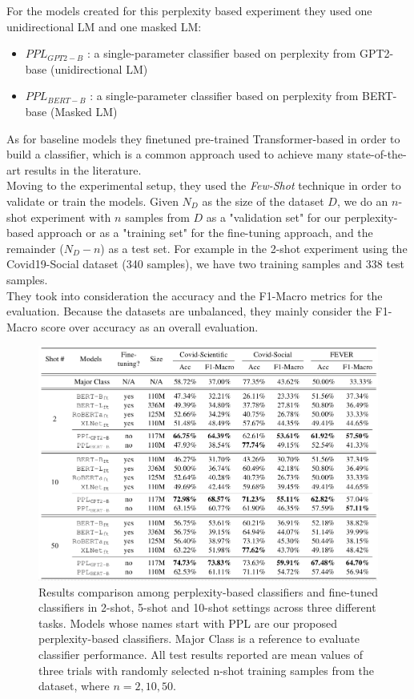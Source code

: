 \documentclass[10pt, english]{report}
\begin{document}
For the models created for this perplexity based experiment they used one unidirectional LM and one masked LM:

\begin{itemize}
\item $PPL_{GPT2-B}$ : a single-parameter classifier based on perplexity from GPT2-base \cite{radford2019language} (unidirectional LM)
\item $PPL_{BERT-B}$ : a single-parameter classifier based on perplexity from BERT-base \cite{devlin2018bert} (Masked LM)
\end{itemize}

As for baseline models they finetuned pre-trained Transformer-based \cite{vaswani2017attention} in order to build a classifier, which is a common approach used to achieve many state-of-the-art results in the literature.\\

Moving to the experimental setup, they used the \textit{Few-Shot} technique in order to validate or train the models. Given $N_D$ as the size of the dataset $D$, we do an $n$-shot experiment with $n$ samples from $D$ as a "validation set" for our perplexity-based approach or as a "training set" for the fine-tuning approach, and the remainder ($N_D - n$) as a test set. For example in the 2-shot experiment using the Covid19-Social dataset (340 samples), we have two training samples and 338 test samples.\\
They took into consideration the accuracy and the F1-Macro metrics for the evaluation. Because the datasets are unbalanced, they mainly consider the F1-Macro score over accuracy as an overall evaluation.\\


\begin{figure}[H]
	\centering
	\includegraphics[scale=0.43]{img/few_shots_perplexity_evaluation.png}
	\caption{Results comparison among perplexity-based classifiers and fine-tuned classifiers in 2-shot, 5-shot and 10-shot settings across three different tasks. Models whose names start with PPL are our proposed perplexity-based classifiers. Major Class is a reference to evaluate classifier performance. All test results reported are mean values of three trials with randomly selected n-shot training samples from the dataset, where $n={2, 10, 50}$. \cite{lee2021towards}}
\end{figure}
\end{document}
